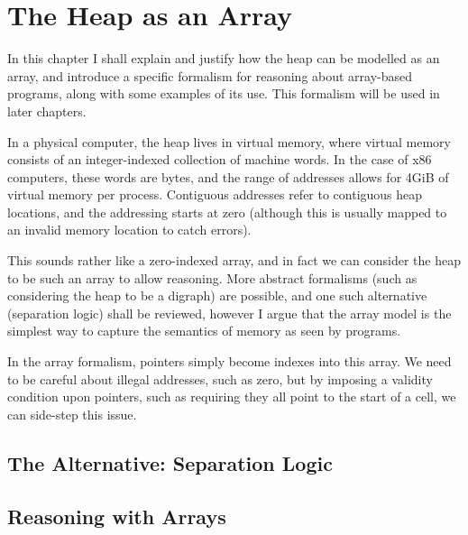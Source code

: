 \chapter{The Heap as an Array}
\label{sec:heap}

In this chapter I shall explain and justify how the heap can be
modelled as an array, and introduce a specific formalism for reasoning
about array-based programs, along with some examples of its use. This
formalism will be used in later chapters.

In a physical computer, the heap lives in virtual memory, where
virtual memory consists of an integer-indexed collection of machine
words. In the case of x86 computers, these words are bytes, and the
range of addresses allows for 4GiB of virtual memory per
process. Contiguous addresses refer to contiguous heap locations, and
the addressing starts at zero (although this is usually mapped to an
invalid memory location to catch errors).

This sounds rather like a zero-indexed array, and in fact we can
consider the heap to be such an array to allow reasoning. More
abstract formalisms (such as considering the heap to be a digraph) are
possible, and one such alternative (separation logic) shall be
reviewed, however I argue that the array model is the simplest way to
capture the semantics of memory as seen by programs.

In the array formalism, pointers simply become indexes into this
array. We need to be careful about illegal addresses, such as zero,
but by imposing a validity condition upon pointers, such as requiring
they all point to the start of a cell, we can side-step this issue.

\section{The Alternative: Separation Logic}
\label{sec:heap-separation}


\section{Reasoning with Arrays}
\label{sec:heap-arrays}




